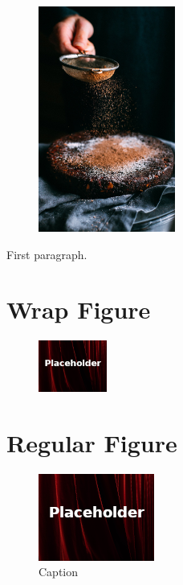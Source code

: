 \begin{figure}
	\centering
	\includegraphics[width=0.4\textwidth]{gfx/05-cake} 
\end{figure}

First paragraph.

\section{Wrap Figure}
\begin{figure}
	\caption{} %
	\label{fig01.01} 
	\centering
	\includegraphics[width=0.2\textwidth]{gfx/99-placeholder} 
\end{figure}

\section{Regular Figure}
\begin{figure}[H]
	\centering
	\includegraphics[width=\maxwidth{.95\linewidth}]{gfx/99-placeholder}
	\caption{Caption}
	\label{fig01.01}
\end{figure}


